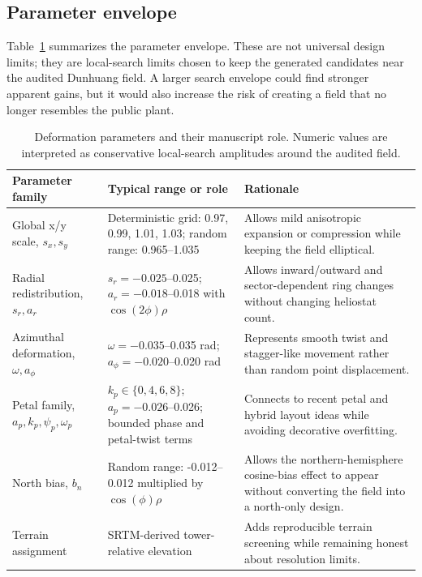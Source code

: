 \documentclass[final,3p,times]{elsarticle}
\begin{document}
\subsection{Parameter envelope}
Table~\ref{tab:param-envelope} summarizes the parameter envelope. These are not universal design limits; they are local-search limits chosen to keep the generated candidates near the audited Dunhuang field. A larger search envelope could find stronger apparent gains, but it would also increase the risk of creating a field that no longer resembles the public plant.

\begin{table}[t]
\centering
\caption{Deformation parameters and their manuscript role. Numeric values are interpreted as conservative local-search amplitudes around the audited field.}
\label{tab:param-envelope}
\small
\begin{tabular}{p{}p{}p{}}
\toprule
Parameter family & Typical range or role & Rationale \\
\midrule
Global x/y scale, $s_x,s_y$ & Deterministic grid: 0.97, 0.99, 1.01, 1.03; random range: 0.965--1.035 & Allows mild anisotropic expansion or compression while keeping the field elliptical. \\
Radial redistribution, $s_r,a_r$ & $s_r=-0.025$--0.025; $a_r=-0.018$--0.018 with $\cos(2\phi)\rho$ & Allows inward/outward and sector-dependent ring changes without changing heliostat count. \\
Azimuthal deformation, $\omega,a_\phi$ & $\omega=-0.035$--0.035 rad; $a_\phi=-0.020$--0.020 rad & Represents smooth twist and stagger-like movement rather than random point displacement. \\
Petal family, $a_p,k_p,\psi_p,\omega_p$ & $k_p\in\{0,4,6,8\}$; $a_p=-0.026$--0.026; bounded phase and petal-twist terms & Connects to recent petal and hybrid layout ideas while avoiding decorative overfitting. \\
North bias, $b_n$ & Random range: -0.012--0.012 multiplied by $\cos(\phi)\rho$ & Allows the northern-hemisphere cosine-bias effect to appear without converting the field into a north-only design. \\
Terrain assignment & SRTM-derived tower-relative elevation & Adds reproducible terrain screening while remaining honest about resolution limits. \\
\bottomrule
\end{tabular}
\end{table}
\FloatBarrier
\end{document}
